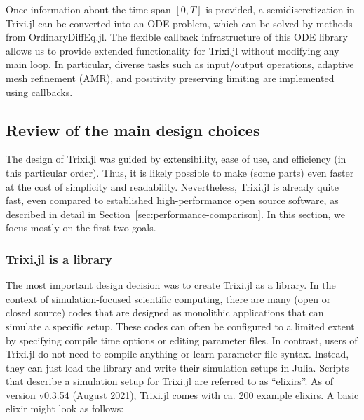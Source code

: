 \documentclass{juliacon}
\makeatletter
\newcommand{\ca}[0]{{ca.\@}\xspace}
\newcommand{\trixi}{Trixi.jl\xspace}
\makeatother
\begin{document}
Once information about the time span $[0, T]$ is provided, a semidiscretization
in \trixi can be converted into an ODE problem, which can be solved by methods
from OrdinaryDiffEq.jl. The flexible callback infrastructure of this ODE library
allows us to provide extended functionality for \trixi without modifying any
main loop. In particular, diverse tasks such as input/output operations, adaptive
mesh refinement (AMR), and positivity preserving limiting are implemented using
callbacks.


\subsection{Review of the main design choices}

The design of \trixi was guided by extensibility, ease of use, and efficiency
(in this particular order). Thus, it is likely possible to make (some parts) even
faster at the cost of simplicity and readability. Nevertheless, \trixi is already quite
fast, even compared to established high-performance open source software,
as described in detail in Section~\ref{sec:performance-comparison}. In this
section, we focus mostly on the first two goals.

\subsubsection{\trixi is a library}

The most important design decision was to create \trixi as a library. In the
context of simulation-focused scientific computing, there are many (open
or closed source) codes that are designed as monolithic applications that can
simulate a specific setup. These codes can often be configured to a limited extent
by specifying compile time options or editing parameter files. In contrast, users of
\trixi do not need to compile anything or learn parameter file syntax. Instead, they can
just load the library and write their simulation setups in Julia. Scripts that describe
a simulation setup for \trixi are referred to as ``elixirs''. As of version
v0.3.54 (August 2021), \trixi comes with \ca 200 example elixirs. A basic elixir
might look as follows:
\end{document}
